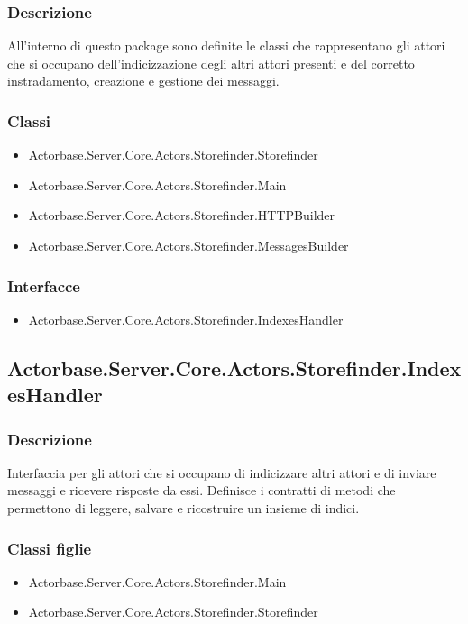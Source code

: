 \documentclass[a4paper]{article}
\begin{document}
			\subsubsection{Descrizione}
				All'interno di questo package sono definite le classi che rappresentano gli attori che si occupano dell'indicizzazione degli altri attori presenti e del corretto instradamento, creazione e gestione dei messaggi.
			\subsubsection{Classi}
			\begin{itemize}
				\item Actorbase.Server.Core.Actors.Storefinder.Storefinder
				\item Actorbase.Server.Core.Actors.Storefinder.Main
				\item Actorbase.Server.Core.Actors.Storefinder.HTTPBuilder
				\item Actorbase.Server.Core.Actors.Storefinder.MessagesBuilder
			\end{itemize}
			\subsubsection{Interfacce}
			\begin{itemize}
				\item Actorbase.Server.Core.Actors.Storefinder.IndexesHandler
			\end{itemize}

		\subsection{Actorbase.Server.Core.Actors.Storefinder.IndexesHandler}
			\subsubsection{Descrizione}
				Interfaccia per gli attori che si occupano di indicizzare altri attori e di inviare messaggi e ricevere risposte da essi. Definisce i contratti di metodi che permettono di leggere, salvare e ricostruire un insieme di indici.
			\subsubsection{Classi figlie}
			\begin{itemize}
				\item Actorbase.Server.Core.Actors.Storefinder.Main
				\item Actorbase.Server.Core.Actors.Storefinder.Storefinder
			\end{itemize}
\end{document}
